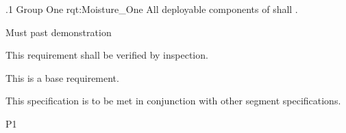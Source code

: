 \ONERQMTVKSA
{\RqtNumberBase.1}
{Group One}
{rqt:Moisture_One}
{All deployable components of \ThisSys shall \TBD.}
{
	\item [Phase 1] Must past demonstration
}
{This requirement shall be verified by inspection.}
{
\item [N/A] This is a base requirement.
}
{
	\item This specification is to be met in conjunction with other segment specifications.
}
{P1}

